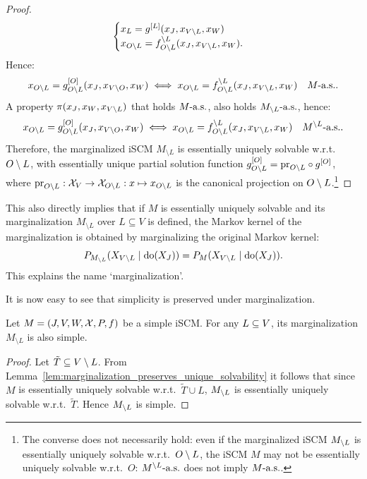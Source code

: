 \begin{proof}
\begin{equation*}
\begin{split}
\begin{cases}
    x_L = g^{[L]}(x_J,x_{V\setminus L},x_W) \\
    x_{O \setminus L} = f_{O \setminus L}^{\setminus L}(x_J,x_{V\setminus L},x_W).
  \end{cases}
  \end{split}\end{equation*}
Hence:
  $$x_{O \setminus L} = g^{[O]}_{O \setminus L}(x_J,x_{V\setminus O},x_W) \iff x_{O \setminus L} = f_{O \setminus L}^{\setminus L}(x_J,x_{V\setminus L},x_W)\quad M\text{-a.s.}.$$
  A property $\pi(x_J,x_W,x_{V\setminus L})$ that holds $M\text{-a.s.}$, also holds $M_{\setminus L}\text{-a.s.}$, hence:
  $$x_{O \setminus L} = g^{[O]}_{O \setminus L}(x_J,x_{V\setminus O},x_W) \iff x_{O \setminus L} = f_{O \setminus L}^{\setminus L}(x_J,x_{V\setminus L},x_W)\quad M^{\setminus L}\text{-a.s.}.$$
  Therefore, the marginalized iSCM $M_{\setminus L}$ is essentially uniquely solvable w.r.t.\ $O\setminus L$, with essentially unique partial solution function $g^{[O]}_{O \setminus L} = \mathrm{pr}_{O\setminus L} \circ g^{[O]}$,
  where $\mathrm{pr}_{O\setminus L} : \mathcal{X}_{V} \to \mathcal{X}_{O\setminus L} : x \mapsto x_{O\setminus L}$ is the canonical projection on $O \setminus L$.\footnote{The converse does not necessarily hold: even if the marginalized iSCM $M_{\setminus L}$ is essentially uniquely solvable w.r.t.\ $O \setminus L$, the iSCM $M$ may not be essentially uniquely solvable w.r.t.\ $O$: $M^{\setminus L}\text{-a.s.}$ does not imply $M\text{-a.s.}$. }
\end{proof}
\begin{Rem}
This also directly implies that if $M$ is essentially uniquely solvable and its marginalization $M_{\setminus L}$ over $L \subseteq V$ is defined, the Markov kernel of the marginalization is obtained by marginalizing the original Markov kernel:
$$P_{M_{\setminus L}}(X_{V\setminus L} \mid \operatorname{do}(X_J)) = P_{M}(X_{V\setminus L} \mid \operatorname{do}(X_J)).$$
This explains the name `marginalization'.
\end{Rem}
It is now easy to see that simplicity is preserved under marginalization.
\begin{Prp}\label{prp:marginalization_preserves_simplicity}
  Let $M = \left ( J, V, W, \mathcal{X}, P, f \right )$ be a simple iSCM. 
  For any $L \subseteq V$, its marginalization $M_{\setminus L}$ is also simple.
\end{Prp}
\begin{proof}
  Let $\tilde T \subseteq V \setminus L$.
  From Lemma~\ref{lem:marginalization_preserves_unique_solvability} it follows that since $M$ is essentially uniquely solvable w.r.t.\ $\tilde{T} \cup L$, $M_{\setminus L}$ is essentially uniquely solvable w.r.t.\ $\tilde{T}$.
  Hence $M_{\setminus L}$ is simple.
\end{proof}

